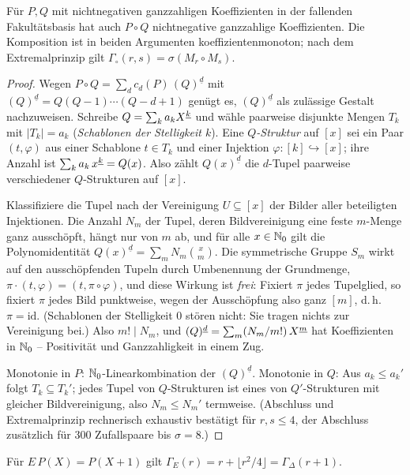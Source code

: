 \begin{satz}
Für $P,Q$ mit nichtnegativen ganzzahligen Koeffizienten in der
fallenden Fakultätsbasis hat auch $P\circ Q$ nichtnegative
ganzzahlige Koeffizienten. Die Komposition ist in beiden Argumenten
koeffizientenmonoton; nach dem Extremalprinzip gilt
$\Gamma_\circ(r,s)=\sigma(M_r\circ M_s)$.
\end{satz}

\begin{proof}
Wegen $P\circ Q=\sum_d c_d(P)\,(Q)^{\underline d}$ mit
$(Q)^{\underline d}=Q(Q{-}1)\cdots(Q{-}d{+}1)$ genügt es,
$(Q)^{\underline d}$ als zulässige Gestalt nachzuweisen. Schreibe
$Q=\sum_k a_kX^{\underline{k}}$ und wähle paarweise disjunkte Mengen $T_k$ mit
$|T_k|=a_k$ (\emph{Schablonen der Stelligkeit $k$}). Eine
\emph{$Q$-Struktur} auf $[x]$ sei ein Paar $(t,\varphi)$ aus einer
Schablone $t\in T_k$ und einer Injektion
$\varphi\colon[k]\hookrightarrow[x]$; ihre Anzahl ist
$\sum_k a_k\,x^{\underline{k}}=Q(x)$. Also zählt $Q(x)^{\underline d}$ die
$d$-Tupel paarweise verschiedener $Q$-Strukturen auf $[x]$.

Klassifiziere die Tupel nach der Vereinigung $U\subseteq[x]$ der
Bilder aller beteiligten Injektionen. Die Anzahl $N_m$ der Tupel,
deren Bildvereinigung eine feste $m$-Menge ganz ausschöpft, hängt
nur von $m$ ab, und für alle $x\in\mathbb N_0$ gilt die Polynomidentität
$Q(x)^{\underline d}=\sum_m N_m\binom xm$. Die symmetrische Gruppe
$S_m$ wirkt auf den ausschöpfenden Tupeln durch Umbenennung der
Grundmenge, $\pi\cdot(t,\varphi)=(t,\pi\circ\varphi)$, und diese
Wirkung ist \emph{frei}: Fixiert $\pi$ jedes Tupelglied, so fixiert
$\pi$ jedes Bild punktweise, wegen der Ausschöpfung also ganz $[m]$,
d.\,h.\ $\pi=\mathrm{id}$. (Schablonen der Stelligkeit 0 stören
nicht: Sie tragen nichts zur Vereinigung bei.) Also $m!\mid N_m$,
und $(Q)^{\underline d}=\sum_m(N_m/m!)\,X^{\underline{m}}$ hat Koeffizienten in
$\mathbb N_0$ -- Positivität und Ganzzahligkeit in einem Zug.

Monotonie in $P$: $\mathbb N_0$-Linearkombination der
$(Q)^{\underline d}$. Monotonie in $Q$: Aus $a_k\le a_k'$ folgt
$T_k\subseteq T_k'$; jedes Tupel von $Q$-Strukturen ist eines von
$Q'$-Strukturen mit gleicher Bildvereinigung, also $N_m\le N_m'$
termweise. (Abschluss und Extremalprinzip rechnerisch exhaustiv
bestätigt für $r,s\le4$, der Abschluss zusätzlich für 300
Zufallspaare bis $\sigma=8$.)
\end{proof}

\begin{satz}
Für $E\,P(X)=P(X{+}1)$ gilt
$\Gamma_E(r)=r+\lfloor r^2/4\rfloor=\Gamma_\Delta(r{+}1)$.
\end{satz}

